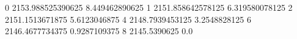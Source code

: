 0 2153.988525390625 8.449462890625
1 2151.858642578125 6.319580078125
2 2151.1513671875 5.6123046875
4 2148.7939453125 3.2548828125
6 2146.4677734375 0.9287109375
8 2145.5390625 0.0
